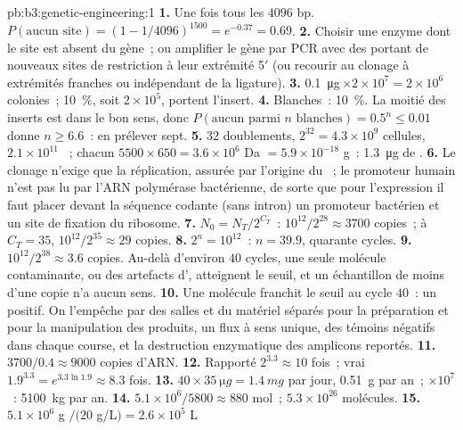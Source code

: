 \begin{solution}{pb:b3:genetic-engineering:1}
\textbf{1.} Une fois tous les $4096$ bp. $P(\text{aucun site}) = (1 - 1/4096)^{1500}
= e^{-0.37} = 0.69$.
\textbf{2.} Choisir une enzyme dont le site est absent du gène~; ou
amplifier le gène par PCR avec des  portant de nouveaux sites de
restriction à leur extrémité 5$'$ (ou recourir au clonage à extrémités
franches ou indépendant de la ligature).
\textbf{3.} \qty{0.1}{\micro g}\,$\times 2\times 10^{7} = 2\times
10^{6}$ colonies~; \qty{10}{\%}, soit $2\times 10^{5}$, portent
l'insert.
\textbf{4.} Blanches~: \qty{10}{\%}. La moitié des inserts est dans le
bon sens, donc $P(\text{aucun parmi } n \text{ blanches}) = 0.5^{n} \le 0.01$
donne $n \ge 6.6$~: en prélever sept.
\textbf{5.} $32$ doublements, $2^{32} = 4.3\times 10^{9}$ cellules,
$2.1\times
10^{11}$ ~; chacun $5500\times 650 = 3.6\times 10^{6}$ Da $=
5.9\times 10^{-18}$ g~: \qty{1.3}{\micro g} de .
\textbf{6.} Le clonage n'exige que la réplication, assurée par
l'origine du ~; le promoteur humain n'est pas lu par l'ARN
polymérase bactérienne, de sorte que pour l'expression il faut placer
devant la séquence codante (sans intron) un promoteur bactérien et un
site de fixation du ribosome.
\textbf{7.} $N_{0} = N_{T}/2^{C_{T}}$~: $10^{12}/2^{28} \approx 3700$
copies~; à $C_{T} = 35$, $10^{12}/2^{35} \approx 29$ copies.
\textbf{8.} $2^{n} = 10^{12}$~: $n = 39.9$, quarante cycles.
\textbf{9.} $10^{12}/2^{38} \approx 3.6$ copies. Au-delà d'environ
$40$ cycles, une seule molécule contaminante, ou des artefacts
d', atteignent le seuil, et un échantillon de moins d'une copie
n'a aucun sens.
\textbf{10.} Une molécule franchit le seuil au cycle $40$~: un positif.
On l'empêche par des salles et du matériel séparés pour la préparation
et pour la manipulation des produits, un flux à sens unique, des
témoins négatifs dans chaque course, et la destruction enzymatique des
amplicons reportés.
\textbf{11.} $3700/0.4 \approx 9000$ copies d'ARN.
\textbf{12.} Rapporté $2^{3.3} \approx 10$ fois~; vrai $1.9^{3.3} =
e^{3.3\ln 1.9} \approx 8.3$ fois.
\textbf{13.} $40\times \qty{35}{\micro g} = \qty{1.4}{mg}$ par jour,
\qty{0.51}{g} par an~; $\times 10^{7}$~: \qty{5100}{kg} par an.
\textbf{14.} $5.1\times 10^{6}/5800 \approx 880$ mol~; $5.3\times 10^{26}$
molécules.
\textbf{15.} $5.1\times 10^{6}$ g $/ (20$ g/L$) = 2.6\times 10^{5}$ L

\end{solution}
